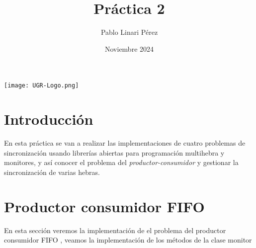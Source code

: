 \documentclass{article}
\title{Práctica 2}
\author{Pablo Linari Pérez}
\date{Noviembre 2024}
\begin{document}
\maketitle
\begin{center}
    \texttt{[image: UGR-Logo.png]} %
\end{center}
\newpage
\tableofcontents

\newpage

\section{Introducción}
En esta práctica se van a realizar las implementaciones de cuatro problemas de sincronización usando librerías abiertas para programación multihebra y monitores, y así conocer el problema del \textit{productor-consumidor} y gestionar la sincronización de varias hebras. 
\section{Productor consumidor FIFO}
En esta sección veremos la implementación de el problema del productor consumidor FIFO , veamos la implementación de los métodos de la clase monitor
\end{document}

